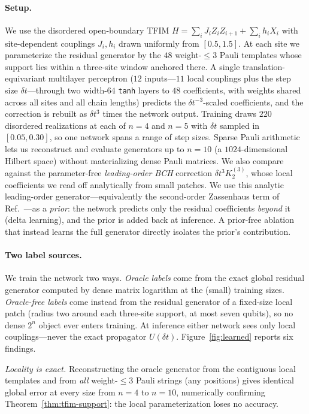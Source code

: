 \documentclass[aps,prxquantum,reprint,superscriptaddress,nofootinbib,amsmath,amssymb]{revtex4-2}
\newcommand{\tfim}{TFIM}
\newcommand{\dt}{\delta t}
\begin{document}
\paragraph{Setup.} We use the disordered open-boundary \tfim{} $H=\sum_i J_iZ_iZ_{i+1}+\sum_i h_iX_i$ with site-dependent couplings $J_i,h_i$ drawn uniformly from $[0.5,1.5]$. At each site we parameterize the residual generator by the $48$ weight-$\leq3$ Pauli templates whose support lies within a three-site window anchored there. A single translation-equivariant multilayer perceptron ($12$ inputs---$11$ local couplings plus the step size $\dt$---through two width-$64$ \texttt{tanh} layers to $48$ coefficients, with weights shared across all sites and all chain lengths) predicts the $\dt^{-3}$-scaled coefficients, and the correction is rebuilt as $\dt^3$ times the network output. Training draws $220$ disordered realizations at each of $n=4$ and $n=5$ with $\dt$ sampled in $[0.05,0.30]$, so one network spans a range of step sizes. Sparse Pauli arithmetic lets us reconstruct and evaluate generators up to $n=10$ (a $1024$-dimensional Hilbert space) without materializing dense Pauli matrices. We also compare against the parameter-free \emph{leading-order BCH} correction $\dt^3K_2^{(3)}$, whose local coefficients we read off analytically from small patches. We use this analytic leading-order generator---equivalently the second-order Zassenhaus term of Ref.~\cite{nguyen2025zassenhaus}---as a \emph{prior}: the network predicts only the residual coefficients \emph{beyond} it (delta learning), and the prior is added back at inference. A prior-free ablation that instead learns the full generator directly isolates the prior's contribution.

\paragraph{Two label sources.} We train the network two ways. \emph{Oracle labels} come from the exact global residual generator computed by dense matrix logarithm at the (small) training sizes. \emph{Oracle-free labels} come instead from the residual generator of a fixed-size local patch (radius two around each three-site support, at most seven qubits), so no dense $2^n$ object ever enters training. At inference either network sees only local couplings---never the exact propagator $U(\dt)$. Figure~\ref{fig:learned} reports six findings.

\emph{Locality is exact.} Reconstructing the oracle generator from the contiguous local templates and from \emph{all} weight-$\leq3$ Pauli strings (any positions) gives identical global error at every size from $n=4$ to $n=10$, numerically confirming Theorem~\ref{thm:tfim-support}: the local parameterization loses no accuracy.
\end{document}
